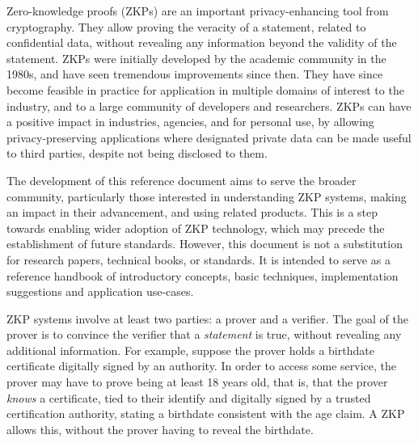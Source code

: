 \label{sec:prelim:executive-summary}


Zero-knowledge proofs (ZKPs) are an important privacy-enhancing tool from cryptography. 
They allow proving the veracity of a statement, related to confidential data, without revealing any information beyond the validity of the statement.
ZKPs were initially developed by the academic community in the 1980s, and have seen tremendous improvements since then.
They have since become feasible in practice for application in multiple domains of interest to the industry, and to a large community of developers and researchers. 
ZKPs can have a positive impact in industries, agencies, and for personal use, by allowing privacy-preserving applications where designated private data can be made useful to third parties, despite not being disclosed to them.


The development of this reference document aims to serve the broader community, particularly those interested in understanding ZKP systems, making an impact in their advancement, and using related products.
This is a step towards enabling wider adoption of ZKP technology, which may precede the establishment of future standards.
However, this document is not a substitution for research papers, technical books, or standards. 
It is intended to serve as a reference handbook of introductory concepts, basic techniques, implementation suggestions and application use-cases. 


ZKP systems involve at least two parties: a prover and a verifier.  
The goal of the prover is to convince the verifier that a \emph{statement} is true, without revealing any additional information.  
For example, suppose the prover holds a birthdate certificate digitally signed by an authority.
In order to access some service, the prover may have to prove being at least 18 years old, that is, that the prover \emph{knows} a certificate, tied to their identify and digitally signed by a trusted certification authority, stating a birthdate consistent with the age claim.
A ZKP allows this, without the prover having to reveal the birthdate.




